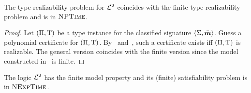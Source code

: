 \begin{proposition}
The type realizability problem for $\mathcal{L}^{2}$ coincides with the finite type
realizability problem and is in $\text{\normalfont{\scshape NPTime}}$.
\end{proposition}
\begin{proof}
Let $(\Pi,\mathrm{T})$ be a type instance for the classified signature
$\left\langle \mathrm{\Sigma},\bar{\bm{m}} \right\rangle$. Guess a polynomial certificate for $(\Pi,\mathrm{T})$.
By~ and~, such a certificate exists
iff $(\Pi,\mathrm{T})$ is realizable.
The general version coincides with the finite version since the model
constructed in~ is finite.
\end{proof}
\begin{corollary}\cite{gradel1997decision}
The logic $\mathcal{L}^{2}$ has the finite model property and its (finite) satisfiability
problem is in $\text{\normalfont{\scshape NExpTime}}$.
\end{corollary}
